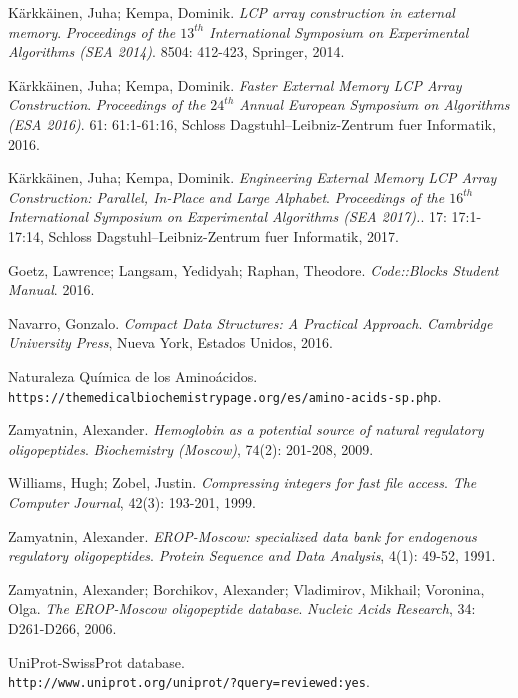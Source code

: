 \documentclass[letterpaper, 10pt, notitlepage]{report}
\begin{document}
\begin{thebibliography}{9}
Kärkkäinen, Juha; Kempa, Dominik.
\textit{LCP array construction in external memory}.
\textit{Proceedings of the $13^{th}$ International Symposium on Experimental Algorithms (SEA 2014)}.
8504: 412-423, Springer, 2014.

Kärkkäinen, Juha; Kempa, Dominik.
\textit{Faster External Memory LCP Array Construction}.
\textit{Proceedings of the $24^{th}$ Annual European Symposium on Algorithms (ESA 2016)}.
61: 61:1-61:16, Schloss Dagstuhl–Leibniz-Zentrum fuer Informatik, 2016.

Kärkkäinen, Juha; Kempa, Dominik.
\textit{Engineering External Memory LCP Array Construction: Parallel, In-Place and Large Alphabet}.
\textit{Proceedings of the $16^{th}$ International Symposium on Experimental Algorithms (SEA 2017).}.
17: 17:1-17:14, Schloss Dagstuhl–Leibniz-Zentrum fuer Informatik, 2017.

Goetz, Lawrence; Langsam, Yedidyah; Raphan, Theodore.
\textit{Code::Blocks Student Manual}. 2016.

Navarro, Gonzalo.
\textit{Compact Data Structures: A Practical Approach}.
\textit{Cambridge University Press}, Nueva York, Estados Unidos, 2016.

Naturaleza Química de los Aminoácidos.
\\\texttt{https://themedicalbiochemistrypage.org/es/amino-acids-sp.php}.

Zamyatnin, Alexander. 
\textit{Hemoglobin as a potential source of natural regulatory oligopeptides}. 
\textit{Biochemistry (Moscow)}, 74(2): 201-208, 2009.

Williams, Hugh; Zobel, Justin.
\textit{Compressing integers for fast file access}.
\textit{The Computer Journal}, 42(3): 193-201, 1999.

Zamyatnin, Alexander. 
\textit{EROP-Moscow: specialized data bank for endogenous regulatory oligopeptides}. 
\textit{Protein Sequence and Data Analysis}, 4(1): 49-52, 1991.

Zamyatnin, Alexander; Borchikov, Alexander; Vladimirov, Mikhail; Voronina, Olga. 
\textit{The EROP-Moscow oligopeptide database}.  
\textit{Nucleic Acids Research}, 34: D261-D266, 2006.


UniProt-SwissProt database.
\\\texttt{http://www.uniprot.org/uniprot/?query=reviewed:yes}.


\end{thebibliography}
\end{document}
